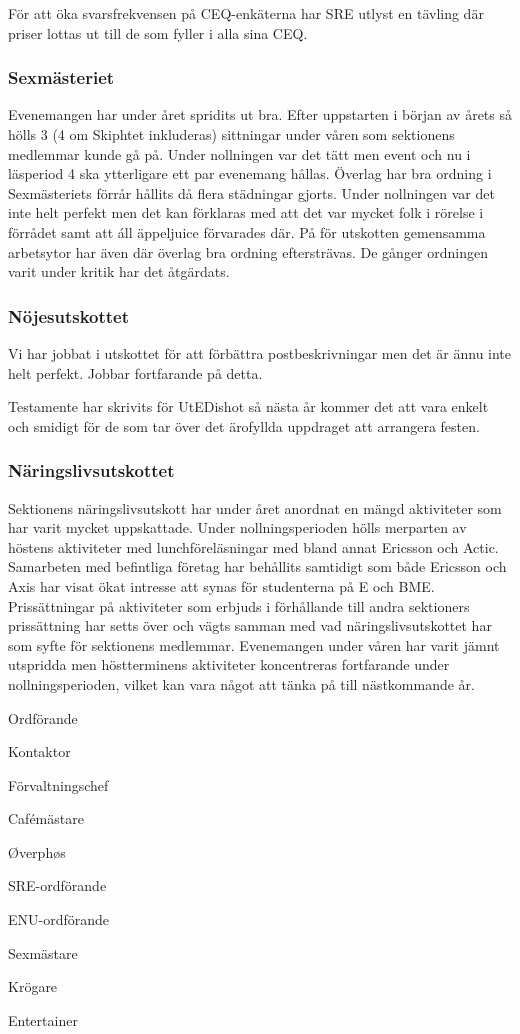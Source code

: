 \documentclass[../_main/handlingar.tex]{subfiles}
\begin{document}
För att öka svarsfrekvensen på CEQ-enkäterna har SRE utlyst en tävling där priser lottas ut till de som fyller i alla sina CEQ.

\subsubsection*{Sexmästeriet}
Evenemangen har under året spridits ut bra. Efter uppstarten i början av årets så hölls 3 (4 om Skiphtet inkluderas) sittningar under våren som sektionens medlemmar kunde gå på. Under nollningen var det tätt men event och nu i läsperiod 4 ska ytterligare ett par evenemang hållas. Överlag har bra ordning i Sexmästeriets förrår hållits då flera städningar gjorts. Under nollningen var det inte helt perfekt men det kan förklaras med att det var mycket folk i rörelse i förrådet samt att áll äppeljuice förvarades där. På för utskotten gemensamma arbetsytor har även där överlag bra ordning eftersträvas. De gånger ordningen varit under kritik har det åtgärdats.


\subsubsection*{Nöjesutskottet}
Vi har jobbat i utskottet för att förbättra postbeskrivningar men det är ännu inte helt perfekt. Jobbar fortfarande på detta.

Testamente har skrivits för UtEDishot så nästa år kommer det att vara enkelt och smidigt för de som tar över det ärofyllda uppdraget att arrangera festen.

\subsubsection*{Näringslivsutskottet}
Sektionens näringslivsutskott har under året anordnat en mängd aktiviteter som har varit mycket uppskattade. Under nollningsperioden hölls merparten av höstens aktiviteter med lunchföreläsningar med bland annat Ericsson och Actic. Samarbeten med befintliga företag har behållits samtidigt som både Ericsson och Axis har visat ökat intresse att synas för studenterna på E och BME. Prissättningar på aktiviteter som erbjuds i förhållande till andra sektioners prissättning har setts över och vägts samman med vad näringslivsutskottet har som syfte för sektionens medlemmar. Evenemangen under våren har varit jämnt utspridda men höstterminens aktiviteter koncentreras fortfarande under nollningsperioden, vilket kan vara något att tänka på till nästkommande år.

\newpage
\begin{signatures}{10}
    \mvh
    \signature{Fredrik Peterson}{Ordförande}
    \signature{Erik Månsson}{Kontaktor}
    \signature{Anders Nilsson}{Förvaltningschef}
    \signature{Stephanie Mirsky}{Cafémästare}
    \signature{Molly Rusk}{Øverphøs}
    \signature{Johan Persson}{SRE-ordförande}
    \signature{Johannes Koch}{ENU-ordförande}
    \signature{Martin Gemborn Nilsson}{Sexmästare}
    \signature{Malin Lindström}{Krögare}
    \signature{Dalia Khairallah}{Entertainer}
\end{signatures}
\end{document}
